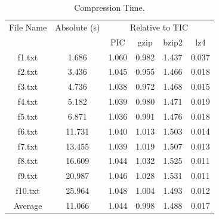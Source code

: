 \begin{table}[ht]
\centering
\begin{tabular}{cccccc}
\hline
File Name & Absolute (s) & \multicolumn{4}{c}{Relative to TIC} \\
 &  & PIC & gzip & bzip2 & lz4 \\
\hline
f1.txt & 1.686 & 1.060 & 0.982 & 1.437 & 0.037 \\
f2.txt & 3.436 & 1.045 & 0.955 & 1.466 & 0.018 \\
f3.txt & 4.736 & 1.038 & 0.972 & 1.468 & 0.015 \\
f4.txt & 5.182 & 1.039 & 0.980 & 1.471 & 0.019 \\
f5.txt & 6.871 & 1.036 & 0.991 & 1.476 & 0.018 \\
f6.txt & 11.731 & 1.040 & 1.013 & 1.503 & 0.014 \\
f7.txt & 13.455 & 1.039 & 1.019 & 1.507 & 0.013 \\
f8.txt & 16.609 & 1.044 & 1.032 & 1.525 & 0.011 \\
f9.txt & 20.987 & 1.046 & 1.028 & 1.531 & 0.011 \\
f10.txt & 25.964 & 1.048 & 1.004 & 1.493 & 0.012 \\
Average & 11.066 & 1.044 & 0.998 & 1.488 & 0.017 \\
\hline
\end{tabular}
\caption{Compression Time.}
\label{tab:compression\_time}
\end{table}
